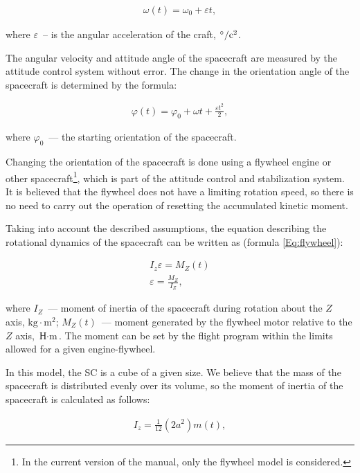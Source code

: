 \documentclass[12pt,a4paper]{article}
\begin{document}
\begin{eqnarray}
  \omega(t) = \omega_0 + \varepsilon t,
\end{eqnarray}

where $\varepsilon$~-- is the angular acceleration of the craft, $\degree/\text{c}^2$.

The angular velocity and attitude angle of the spacecraft are measured by the attitude control system without error. The change in the orientation angle of the spacecraft is determined by the formula:

\begin{eqnarray}
   \varphi(t) = \varphi_0 + \omega t + \frac{\varepsilon t^2}{2},
\end{eqnarray}

where $\varphi_0$~--- the starting orientation of the spacecraft.

Changing the orientation of the spacecraft is done using a flywheel engine or other spacecraft\footnote{In the current version of the manual, only the flywheel model is considered.}, which is part of the attitude control and stabilization system. It is believed that the flywheel does not have a limiting rotation speed, so there is no need to carry out the operation of resetting the accumulated kinetic moment.

Taking into account the described assumptions, the equation describing the rotational dynamics of the spacecraft can be written as (formula \ref{Eq:flywheel}):

\begin{eqnarray}
  I_z \varepsilon = M_Z(t) \label{Eq:flywheel}\\
  \varepsilon = \frac{M_Z}{I_Z}, \label{Eq:angular-acceleration}
\end{eqnarray}

where $I_Z$~--- moment of inertia of the spacecraft during rotation about the $Z$ axis, $\text{kg} \cdot \text{m}^2$; $M_Z(t)$~--- moment generated by the flywheel motor relative to the $Z$ axis, $\text{Н} \cdot \text{m}$. The moment can be set by the flight program within the limits allowed for a given engine-flywheel.

In this model, the SC is a cube of a given size. We believe that the mass of the spacecraft is distributed evenly over its volume, so the moment of inertia of the spacecraft is calculated as follows:

\begin{eqnarray}
   I_z = \frac{1}{12} (2 a^2) m(t), \label{Eq:inertia-moment}
\end{eqnarray}
\end{document}
